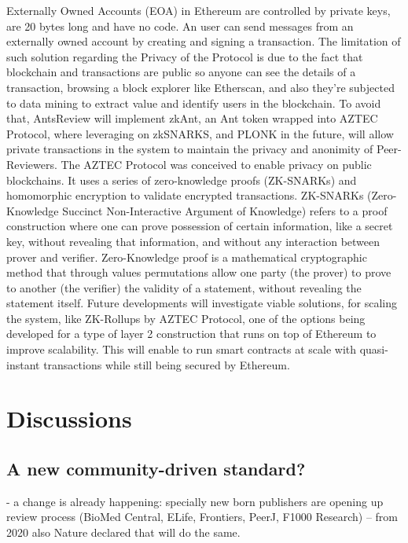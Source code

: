 \documentclass[runningheads]{llncs}
\begin{document}
{ Externally Owned Accounts (EOA) in Ethereum are controlled by private keys, are 20 bytes long and have no code. An user can send messages from an externally owned account by creating and signing a transaction.
\newline The limitation of such solution regarding the Privacy of the Protocol is due to the fact that blockchain and transactions are public so anyone can see the details of a transaction, browsing a block explorer like Etherscan, and also they're subjected to data mining to extract value and identify users in the blockchain.
\newline To avoid that, AntsReview will implement zkAnt, an Ant token wrapped into AZTEC Protocol, where leveraging on zkSNARKS, and PLONK in the future, will allow private transactions in the system to maintain the privacy and anonimity of Peer-Reviewers.
\newline The AZTEC Protocol was conceived to enable privacy on public blockchains. It uses a series of zero-knowledge proofs (ZK-SNARKs) and homomorphic encryption to validate encrypted transactions.
\newline ZK-SNARKs (Zero-Knowledge Succinct Non-Interactive Argument of Knowledge) \cite{ZKSNARKs} refers to a proof construction where one can prove possession of certain information, like a secret key, without revealing that information, and without any interaction between prover and verifier.
\newline Zero-Knowledge \cite{ZeroKnoledge} proof is a mathematical cryptographic method that through values permutations allow one party (the prover) to prove to another (the verifier) the validity of a statement, without revealing the statement itself.
\newline Future developments will investigate viable solutions, for scaling the system, like ZK-Rollups by AZTEC Protocol, one of the options being developed for a type of layer 2 construction that runs on top of Ethereum to improve scalability. This will enable to run smart contracts at scale with quasi-instant transactions while still being secured by Ethereum.

\section{Discussions}
\subsection{A new community-driven standard?}
- a change is already happening: specially new born publishers are opening up review process (BioMed Central, ELife, Frontiers, PeerJ, F1000 Research) -- from 2020 also Nature declared that will do the same.

}
\end{document}
